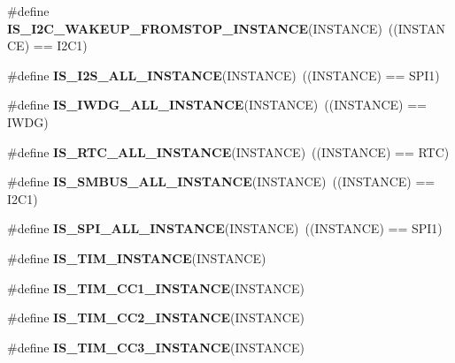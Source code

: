 \begin{DoxyCompactItemize}
\item 
\mbox{\label{group___exported__macro_gadf692bda16bac3264bccff7f59ddaab9}} 
\#define {\bfseries I\+S\+\_\+\+I2\+C\+\_\+\+W\+A\+K\+E\+U\+P\+\_\+\+F\+R\+O\+M\+S\+T\+O\+P\+\_\+\+I\+N\+S\+T\+A\+N\+CE}(I\+N\+S\+T\+A\+N\+CE)~((I\+N\+S\+T\+A\+N\+CE) == I2\+C1)
\item 
\mbox{\label{group___exported__macro_ga0b35685911e3c7a38ee89e5cdc5a82fa}} 
\#define {\bfseries I\+S\+\_\+\+I2\+S\+\_\+\+A\+L\+L\+\_\+\+I\+N\+S\+T\+A\+N\+CE}(I\+N\+S\+T\+A\+N\+CE)~((I\+N\+S\+T\+A\+N\+CE) == S\+P\+I1)
\item 
\mbox{\label{group___exported__macro_gad9ec4c52f0572ee67d043e006f1d5e39}} 
\#define {\bfseries I\+S\+\_\+\+I\+W\+D\+G\+\_\+\+A\+L\+L\+\_\+\+I\+N\+S\+T\+A\+N\+CE}(I\+N\+S\+T\+A\+N\+CE)~((I\+N\+S\+T\+A\+N\+CE) == I\+W\+DG)
\item 
\mbox{\label{group___exported__macro_gab4230e8bd4d88adc4250f041d67375ce}} 
\#define {\bfseries I\+S\+\_\+\+R\+T\+C\+\_\+\+A\+L\+L\+\_\+\+I\+N\+S\+T\+A\+N\+CE}(I\+N\+S\+T\+A\+N\+CE)~((I\+N\+S\+T\+A\+N\+CE) == R\+TC)
\item 
\mbox{\label{group___exported__macro_gaf492fcfe71eab8d1dadf4d837b840af6}} 
\#define {\bfseries I\+S\+\_\+\+S\+M\+B\+U\+S\+\_\+\+A\+L\+L\+\_\+\+I\+N\+S\+T\+A\+N\+CE}(I\+N\+S\+T\+A\+N\+CE)~((I\+N\+S\+T\+A\+N\+CE) == I2\+C1)
\item 
\mbox{\label{group___exported__macro_ga59c7619a86c03df3ebeb4bd8aaef982c}} 
\#define {\bfseries I\+S\+\_\+\+S\+P\+I\+\_\+\+A\+L\+L\+\_\+\+I\+N\+S\+T\+A\+N\+CE}(I\+N\+S\+T\+A\+N\+CE)~((I\+N\+S\+T\+A\+N\+CE) == S\+P\+I1)
\item 
\#define {\bfseries I\+S\+\_\+\+T\+I\+M\+\_\+\+I\+N\+S\+T\+A\+N\+CE}(I\+N\+S\+T\+A\+N\+CE)
\item 
\#define {\bfseries I\+S\+\_\+\+T\+I\+M\+\_\+\+C\+C1\+\_\+\+I\+N\+S\+T\+A\+N\+CE}(I\+N\+S\+T\+A\+N\+CE)
\item 
\#define {\bfseries I\+S\+\_\+\+T\+I\+M\+\_\+\+C\+C2\+\_\+\+I\+N\+S\+T\+A\+N\+CE}(I\+N\+S\+T\+A\+N\+CE)
\item 
\#define {\bfseries I\+S\+\_\+\+T\+I\+M\+\_\+\+C\+C3\+\_\+\+I\+N\+S\+T\+A\+N\+CE}(I\+N\+S\+T\+A\+N\+CE)

\end{DoxyCompactItemize}
